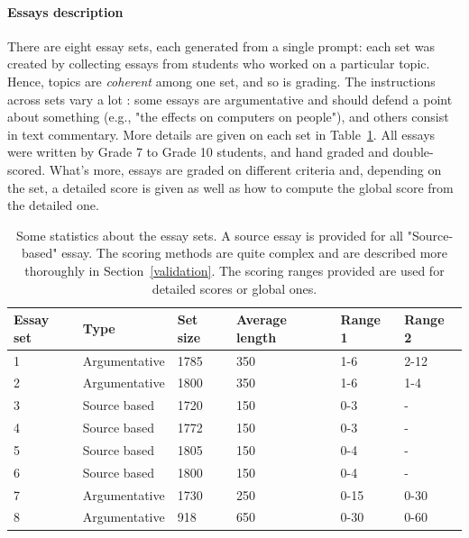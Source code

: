 \documentclass[a4paper,12pt,english]{article}
\begin{document}
\paragraph{Essays description} There are eight essay sets, each generated from a single prompt: each set was created by collecting essays from students who worked on a particular topic. Hence, topics are \emph{coherent} among one set, and so is grading. The instructions across sets vary a lot : some essays are argumentative and should defend a point about something (e.g., "the effects on computers on people"), and others consist in text commentary. More details are given on each set in Table~\ref{setsdescription}. All essays were written by Grade 7 to Grade 10 students, and hand graded and double-scored. What's more, essays are graded on different criteria and, depending on the set, a detailed score is given as well as how to compute the global score from the detailed one.

\begin{table}
	\centering
	\begin{tabular}{llllll}
	\hline
	Essay set & Type & Set size & Average length & Range 1 & Range 2\\
	\hline
	1 & Argumentative & 1785 & 350 & 1-6 & 2-12\\
	2 & Argumentative & 1800 & 350 & 1-6 & 1-4\\
	3 & Source based  & 1720 & 150 & 0-3 & -\\
	4 & Source based  & 1772 & 150 & 0-3 & -\\
	5 & Source based  & 1805 & 150 & 0-4 & -\\
	6 & Source based  & 1800 & 150 & 0-4 & -\\
	7 & Argumentative & 1730 & 250 & 0-15 & 0-30\\
	8 & Argumentative & 918  & 650 & 0-30 & 0-60\\
	\hline
	\end{tabular}
	\caption{Some statistics about the essay sets. A source essay is provided for all "Source-based" essay. The scoring methods are quite complex and are described more thoroughly in Section~\ref{validation}. The scoring ranges provided are used for detailed scores or global ones.}
	\label{setsdescription}
\end{table}
\end{document}
